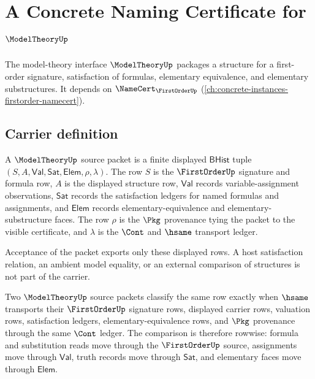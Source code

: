 \chapter{A Concrete Naming Certificate for $\ModelTheoryUp$}
\label{ch:concrete-instances-modeltheory-namecert}

The model-theory interface $\ModelTheoryUp$ packages a structure for a first-order signature, satisfaction of formulas, elementary equivalence, and elementary substructures. It depends on $\NameCert_{\FirstOrderUp}$ (\autoref{ch:concrete-instances-firstorder-namecert}).

\section{Carrier definition}
\label{sec:modeltheory-carrier}

\begin{definition}\label{def:modeltheory-bhist-structure-packet}
A $\ModelTheoryUp$ source packet is a finite displayed $\mathsf{BHist}$ tuple
$(S,A,\mathsf{Val},\mathsf{Sat},\mathsf{Elem},\rho,\lambda)$. The row $S$ is
the $\FirstOrderUp$ signature and formula row, $A$ is the displayed structure
row, $\mathsf{Val}$ records variable-assignment observations, $\mathsf{Sat}$
records the satisfaction ledgers for named formulas and assignments, and
$\mathsf{Elem}$ records elementary-equivalence and elementary-substructure
faces. The row $\rho$ is the $\Pkg$ provenance tying the packet to the visible
certificate, and $\lambda$ is the $\Cont$ and $\hsame$ transport ledger.

Acceptance of the packet exports only these displayed rows. A host
satisfaction relation, an ambient model equality, or an external comparison
of structures is not part of the carrier.
\end{definition}

\begin{definition}\label{def:modeltheory-satisfaction-ledger-classifier}
Two $\ModelTheoryUp$ source packets classify the same row exactly when
$\hsame$ transports their $\FirstOrderUp$ signature rows, displayed carrier
rows, valuation rows, satisfaction ledgers, elementary-equivalence rows, and
$\Pkg$ provenance through the same $\Cont$ ledger. The comparison is therefore
rowwise: formula and substitution reads move through the $\FirstOrderUp$
source, assignments move through $\mathsf{Val}$, truth records move through
$\mathsf{Sat}$, and elementary faces move through $\mathsf{Elem}$.
\end{definition}

